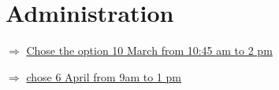 \section{Administration}


$\Rightarrow$ \href{https://employeecourses.dtu.dk/en/hr/administrative-staff/dtu-culture-day/}{Chose the option 10 March from 10:45 am to 2 pm}


$\Rightarrow$ \href{https://employeecourses.dtu.dk/en/hr/administrative-staff/introduction-to-responsible-conduct-of-research-and-research-data-management-for-new-employees/}{chose 6 April from 9am to 1 pm}

